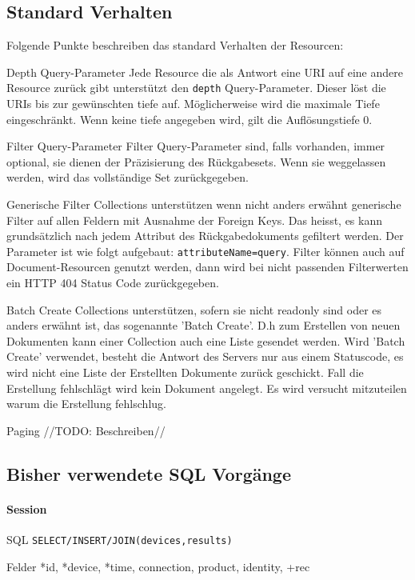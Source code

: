 \documentclass[10pt,a4paper]{scrartcl}
\begin{document}
\subsection{Standard Verhalten}
Folgende Punkte beschreiben das standard Verhalten der Resourcen:
\begin{description*}
	\item[Depth Query-Parameter] Jede Resource die als Antwort eine URI auf eine
		andere Resource zurück gibt unterstützt den \texttt{depth} Query-Parameter.
		Dieser löst die URIs bis zur gewünschten tiefe auf.  Möglicherweise wird die
		maximale Tiefe eingeschränkt. Wenn keine tiefe angegeben wird, gilt die
		Auflösungstiefe 0.
	\item[Filter Query-Parameter] Filter Query-Parameter sind, falls vorhanden,
		immer optional, sie dienen der Präzisierung des Rückgabesets. Wenn sie
		weggelassen werden, wird das vollständige Set zurückgegeben.
	\item[Generische Filter] Collections unterstützen wenn nicht anders erwähnt
		generische Filter auf allen Feldern mit Ausnahme der Foreign Keys. Das
		heisst, es kann grundsätzlich nach jedem Attribut des Rückgabedokuments
		gefiltert werden. Der Parameter ist wie folgt aufgebaut:
		\texttt{attributeName=query}. Filter können auch auf Document-Resourcen
		genutzt werden, dann wird bei nicht passenden Filterwerten ein HTTP 404
		Status Code zurückgegeben. 
	\item[Batch Create] Collections unterstützen, sofern sie nicht readonly sind
		oder es anders erwähnt ist, das sogenannte 'Batch Create'. D.h zum Erstellen
		von neuen Dokumenten kann einer Collection auch eine Liste gesendet werden.
		Wird 'Batch Create' verwendet, besteht die Antwort des Servers nur aus einem
		Statuscode, es wird nicht eine Liste der Erstellten Dokumente zurück
		geschickt. Fall die Erstellung fehlschlägt wird kein Dokument angelegt. Es
		wird versucht mitzuteilen warum die Erstellung fehlschlug.
	\item[Paging] //TODO: Beschreiben//  
\end{description*}
 
\pagebreak
\subsection{Bisher verwendete SQL Vorgänge}
\paragraph{Session}
\begin{description*}
	\item[SQL] \texttt{SELECT/INSERT/JOIN(devices,results)}
	\item[Felder] *id, *device, *time, connection, product, identity, +rec
\end{description*}
\end{document}
